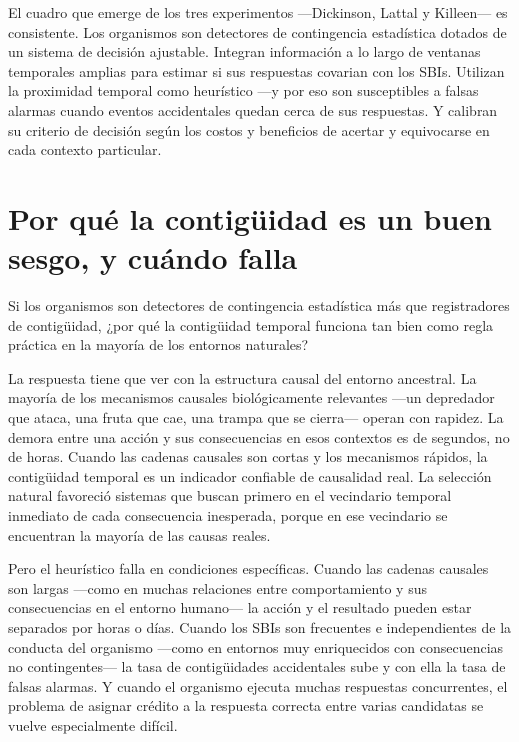 \documentclass[
  letterpaper,
  DIV=11,
  numbers=noendperiod]{scrreprt}
\begin{document}
\begin{tcolorbox}[enhanced jigsaw, toprule=.15mm, arc=.35mm, colback=white, opacityback=0, colframe=quarto-callout-note-color-frame, breakable, rightrule=.15mm, left=2mm, leftrule=.75mm, bottomrule=.15mm]
El cuadro que emerge de los tres experimentos ---Dickinson, Lattal y
Killeen--- es consistente. Los organismos son detectores de contingencia
estadística dotados de un sistema de decisión ajustable. Integran
información a lo largo de ventanas temporales amplias para estimar si
sus respuestas covarian con los SBIs. Utilizan la proximidad temporal
como heurístico ---y por eso son susceptibles a falsas alarmas cuando
eventos accidentales quedan cerca de sus respuestas. Y calibran su
criterio de decisión según los costos y beneficios de acertar y
equivocarse en cada contexto particular.

\section{Por qué la contigüidad es un buen sesgo, y cuándo
falla}\label{por-quuxe9-la-contiguxfcidad-es-un-buen-sesgo-y-cuuxe1ndo-falla}

Si los organismos son detectores de contingencia estadística más que
registradores de contigüidad, ¿por qué la contigüidad temporal funciona
tan bien como regla práctica en la mayoría de los entornos naturales?

La respuesta tiene que ver con la estructura causal del entorno
ancestral. La mayoría de los mecanismos causales biológicamente
relevantes ---un depredador que ataca, una fruta que cae, una trampa que
se cierra--- operan con rapidez. La demora entre una acción y sus
consecuencias en esos contextos es de segundos, no de horas. Cuando las
cadenas causales son cortas y los mecanismos rápidos, la contigüidad
temporal es un indicador confiable de causalidad real. La selección
natural favoreció sistemas que buscan primero en el vecindario temporal
inmediato de cada consecuencia inesperada, porque en ese vecindario se
encuentran la mayoría de las causas reales.

Pero el heurístico falla en condiciones específicas. Cuando las cadenas
causales son largas ---como en muchas relaciones entre comportamiento y
sus consecuencias en el entorno humano--- la acción y el resultado
pueden estar separados por horas o días. Cuando los SBIs son frecuentes
e independientes de la conducta del organismo ---como en entornos muy
enriquecidos con consecuencias no contingentes--- la tasa de
contigüidades accidentales sube y con ella la tasa de falsas alarmas. Y
cuando el organismo ejecuta muchas respuestas concurrentes, el problema
de asignar crédito a la respuesta correcta entre varias candidatas se
vuelve especialmente difícil.


\end{tcolorbox}
\end{document}

